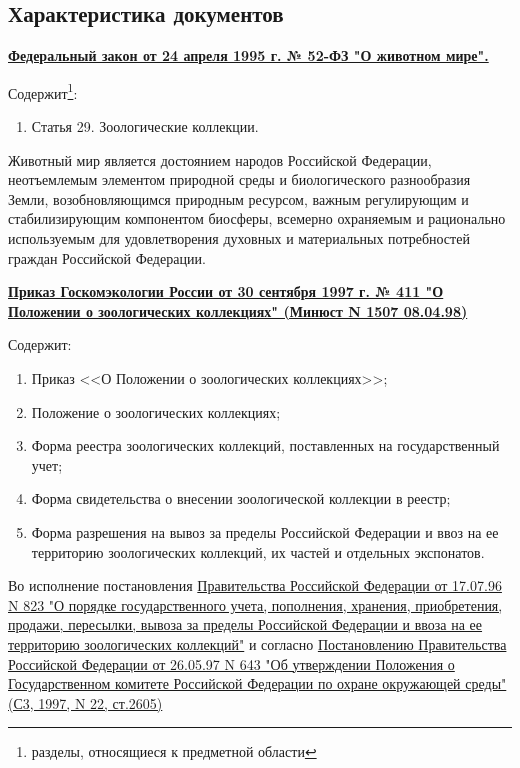\documentclass[10pt, a4paper, titlepage]{article}
\begin{document}
\subsection{Характеристика документов}

\href{https://docs.cntd.ru/document/9011346}{\textbf{Федеральный закон от 24 апреля 1995 г. № 52-ФЗ "О животном мире".}}

Содержит\footnote{разделы, относящиеся к предметной области}:
\begin{enumerate}
    \item Статья 29. Зоологические коллекции.
\end{enumerate}

Животный мир является достоянием народов Российской Федерации, неотъемлемым элементом природной среды и биологического разнообразия Земли, возобновляющимся природным ресурсом, важным регулирующим и стабилизирующим компонентом биосферы, всемерно охраняемым и рационально используемым для удовлетворения духовных и материальных потребностей граждан Российской Федерации.

\href{https://docs.cntd.ru/document/58812875}{\textbf{Приказ Госкомэкологии России от 30 сентября 1997 г. № 411 "О Положении о зоологических коллекциях" (Минюст N 1507 08.04.98)}}

Содержит:
\begin{enumerate}
    \item Приказ <<О Положении о зоологических коллекциях>>;
    
    \item Положение о зоологических коллекциях;
    
    \item Форма реестра зоологических коллекций, поставленных на государственный учет;
    
    \item Форма свидетельства о внесении зоологической коллекции в реестр;
    
    \item Форма разрешения на вывоз за пределы Российской Федерации и ввоз на ее территорию зоологических коллекций, их частей и отдельных экспонатов.

\end{enumerate}

Во исполнение постановления \href{https://docs.cntd.ru/document/9026760?marker}{Правительства Российской Федерации от 17.07.96 N 823 "О порядке государственного учета, пополнения, хранения, приобретения, продажи, пересылки, вывоза за пределы Российской Федерации и ввоза на ее территорию зоологических коллекций"} и согласно \href{https://docs.cntd.ru/document/9050595?marker}{Постановлению Правительства Российской Федерации от 26.05.97 N 643 "Об утверждении Положения о Государственном комитете Российской Федерации по охране окружающей среды" (С3, 1997, N 22, ст.2605)}
\end{document}
